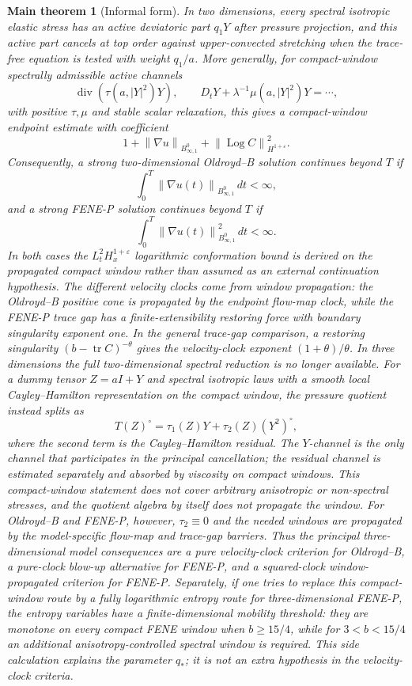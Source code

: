 \documentclass[11pt]{article}
\newtheorem*{mainthm}{Main theorem}
\newcommand{\tr}{\operatorname{tr}}
\newcommand{\divv}{\operatorname{div}}
\newcommand{\Log}{\operatorname{Log}}
\newcommand{\eps}{\varepsilon}
\newcommand{\norm}[1]{\left\lVert #1\right\rVert}
\begin{document}
\begin{mainthm}[Informal form]
In two dimensions, every spectral isotropic elastic stress has an active
deviatoric part \(q_1Y\) after pressure projection, and this active part
cancels at top order against upper-convected stretching when the trace-free
equation is tested with weight \(q_1/a\).  More generally, for compact-window
spectrally admissible active channels
\[
  \divv(\tau(a,|Y|^2)Y),\qquad
  D_tY+\lambda^{-1}\mu(a,|Y|^2)Y=\cdots ,
\]
with positive \(\tau,\mu\) and stable scalar relaxation, this gives a
compact-window endpoint estimate with coefficient
\[
  1+\norm{\nabla u}_{B^0_{\infty,1}}
  +\norm{\Log C}_{H^{1+\eps}}^2 .
\]
Consequently, a strong two-dimensional Oldroyd--B solution continues beyond
\(T\) if
\[
  \int_0^T\norm{\nabla u(t)}_{B^0_{\infty,1}}\,dt<\infty,
\]
and a strong FENE-P solution continues beyond \(T\) if
\[
  \int_0^T\norm{\nabla u(t)}_{B^0_{\infty,1}}^2\,dt<\infty .
\]
In both cases the \(L^2_tH^{1+\eps}_x\) logarithmic conformation bound is
derived on the propagated compact window rather than assumed as an external
continuation hypothesis.
The different velocity clocks come from window propagation: the Oldroyd--B
positive cone is propagated by the endpoint flow-map clock, while the FENE-P
trace gap has a finite-extensibility restoring force with boundary singularity
exponent one.  In the general trace-gap comparison, a restoring singularity
\((b-\tr C)^{-\theta}\) gives the velocity-clock exponent
\((1+\theta)/\theta\).
In three dimensions the full two-dimensional spectral reduction is no longer
available.  For a dummy tensor \(Z=aI+Y\) and spectral isotropic laws with a
smooth local Cayley--Hamilton representation on the compact window, the pressure
quotient instead splits as
\[
  T(Z)^\circ=\tau_1(Z)Y+\tau_2(Z)(Y^2)^\circ,
\]
where the second term is the Cayley--Hamilton residual.  The \(Y\)-channel is
the only channel that participates in the principal cancellation; the residual
channel is estimated separately and absorbed by viscosity on compact windows.
This compact-window statement does not cover arbitrary anisotropic or
non-spectral stresses, and the quotient algebra by itself does not propagate the
window.  For Oldroyd--B and FENE-P, however, \(\tau_2\equiv0\) and the needed
windows are propagated by the model-specific flow-map and trace-gap barriers.
Thus the principal three-dimensional model consequences are a pure velocity-clock
criterion for Oldroyd--B, a pure-clock blow-up alternative for FENE-P, and a
squared-clock window-propagated criterion for FENE-P.  Separately, if one tries
to replace this compact-window route by a fully logarithmic entropy route for
three-dimensional FENE-P, the entropy variables have a finite-dimensional
mobility threshold: they are monotone on every compact FENE window when
\(b\ge15/4\), while for \(3<b<15/4\) an additional anisotropy-controlled spectral
window is required.  This side calculation explains the parameter \(q_*\); it is
not an extra hypothesis in the velocity-clock criteria.
\end{mainthm}
\end{document}
